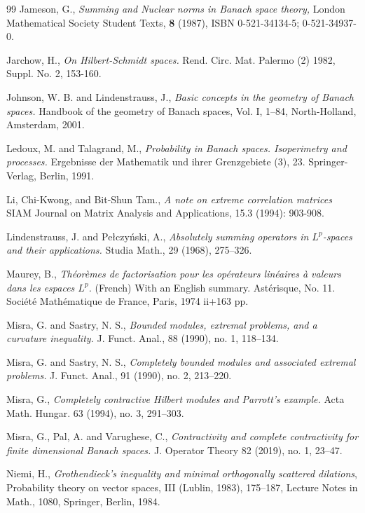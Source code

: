 \documentclass[a4paper,oneside,11pt, reqno]{amsart}
\numberwithin{equation}{section}
\theoremstyle{plain}
\begin{document}
\begin{thebibliography}{99}
 Jameson, G., \emph{Summing and Nuclear norms in Banach space theory,} London Mathematical Society Student Texts, \textbf{8} (1987), ISBN 0-521-34134-5; 0-521-34937-0.

 Jarchow, H.,
 \emph{On Hilbert-Schmidt spaces.}
 Rend. Circ. Mat. Palermo (2) 1982, Suppl. No. 2, 153-160.

 Johnson, W. B. and Lindenstrauss, J.,
 \emph{Basic concepts in the geometry of Banach spaces.} Handbook of the geometry of Banach spaces, Vol. I, 1–84, North-Holland, Amsterdam, 2001.
 
 Ledoux, M. and Talagrand, M.,
\emph{Probability in Banach spaces.
Isoperimetry and processes.} Ergebnisse der Mathematik und ihrer Grenzgebiete (3), 23. Springer-Verlag, Berlin, 1991.

  Li, Chi-Kwong, and Bit-Shun Tam., \emph{A note on extreme correlation matrices} SIAM Journal on Matrix Analysis and Applications, 15.3 (1994): 903-908.
 
 Lindenstrauss, J. and Pełczyński, A., \emph{Absolutely summing operators in $L^p$-spaces and their applications.} Studia Math., 29 (1968), 275–326.

 Maurey, B., \emph{Théorèmes de factorisation pour les opérateurs linéaires à valeurs dans les espaces $L^p$.} (French) With an English summary. Astérisque, No. 11. Société Mathématique de France, Paris, 1974 ii+163 pp.

 
  Misra, G. and Sastry, N. S., \emph{Bounded modules, extremal problems, and a curvature inequality.} J. Funct. Anal., 88 (1990), no. 1, 118–134.

Misra, G. and Sastry, N. S.,  \emph{Completely bounded modules and associated extremal problems.} J. Funct. Anal., 91 (1990), no. 2, 213–220.

  Misra, G., \emph{Completely contractive Hilbert modules and Parrott's example.} Acta Math. Hungar. 63 (1994), no. 3, 291–303.

  Misra, G., Pal, A. and Varughese, C., \emph{Contractivity and complete contractivity for finite dimensional Banach spaces.} J. Operator Theory 82 (2019), no. 1, 23–47.


  Niemi, H., \emph{Grothendieck's inequality and minimal orthogonally scattered dilations}, Probability theory on vector spaces, III (Lublin, 1983), 175–187, Lecture Notes in Math., 1080, Springer, Berlin, 1984.


\end{thebibliography}
\end{document}

